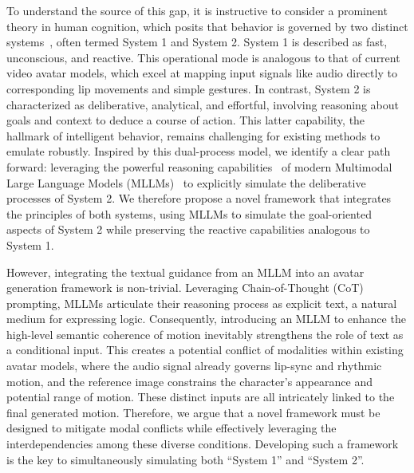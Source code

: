 To understand the source of this gap, it is instructive to consider a prominent theory in human cognition, which posits that behavior is governed by two distinct systems~\cite{kahneman2011thinking,kahneman2013prospect}, often termed System 1 and System 2. System 1 is described as fast, unconscious, and reactive. This operational mode is analogous to that of current video avatar models, which excel at mapping input signals like audio directly to corresponding lip movements and simple gestures. In contrast, System 2 is characterized as deliberative, analytical, and effortful, involving reasoning about goals and context to deduce a course of action. This latter capability, the hallmark of intelligent behavior, remains challenging for existing methods to emulate robustly. Inspired by this dual-process model, we identify a clear path forward: leveraging the powerful reasoning capabilities~\cite{wei2022chain, wangself, yao2023tree, schick2023toolformer, park2023generative, yuan2024mora, wu2025automated} of modern Multimodal Large Language Models (MLLMs)~\cite{team2023gemini,GPT4o} to explicitly simulate the deliberative processes of System 2. We therefore propose a novel framework that integrates the principles of both systems, using MLLMs to simulate the goal-oriented aspects of System 2 while preserving the reactive capabilities analogous to System 1.


However, integrating the textual guidance from an MLLM into an avatar generation framework is non-trivial. Leveraging Chain-of-Thought (CoT)~\cite{wei2022chain} prompting, MLLMs articulate their reasoning process as explicit text, a natural medium for expressing logic. Consequently, introducing an MLLM to enhance the high-level semantic coherence of motion inevitably strengthens the role of text as a conditional input. This creates a potential conflict of modalities within existing avatar models, where the audio signal already governs lip-sync and rhythmic motion, and the reference image constrains the character's appearance and potential range of motion. These distinct inputs are all intricately linked to the final generated motion. Therefore, we argue that a novel framework must be designed to mitigate modal conflicts while effectively leveraging the interdependencies among these diverse conditions. Developing such a framework is the key to simultaneously simulating both ``System 1'' and ``System 2''.



